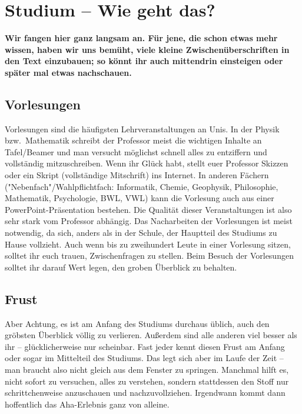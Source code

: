 \section{Studium -- Wie geht das?}
\begin{multicols}{2}
\fibelspacingsubsubsection[subsection]

\textbf{Wir fangen hier ganz langsam an.
Für jene, die schon etwas mehr wissen, haben wir uns bemüht, viele kleine Zwischenüberschriften in den Text einzubauen; so könnt ihr auch mittendrin einsteigen oder später mal etwas nachschauen.}

\subsection{Vorlesungen}
Vorlesungen sind die häufigsten Lehrveranstaltungen an Unis.
In der Physik bzw.\ Mathematik schreibt der Professor meist die wichtigen Inhalte an Tafel/Beamer und man versucht möglichst schnell alles zu entziffern und vollständig mitzuschreiben.
Wenn ihr Glück habt, stellt euer Professor Skizzen oder ein Skript (vollständige Mitschrift) ins Internet.
In anderen Fächern ("Nebenfach"/Wahlpflichtfach: Informatik, Chemie, Geophysik, Philosophie, Mathematik, Psychologie, BWL, VWL) kann die Vorlesung auch aus einer PowerPoint-Präsentation bestehen.
Die Qualität dieser Veranstaltungen ist also sehr stark vom Professor abhängig.
Das Nacharbeiten der Vorlesungen ist meist notwendig, da sich, anders als in der Schule, der Hauptteil des Studiums zu Hause vollzieht.
Auch wenn bis zu zweihundert Leute in einer Vorlesung sitzen, solltet ihr euch trauen, Zwischenfragen zu stellen.
Beim Besuch der Vorlesungen solltet ihr darauf Wert legen, den groben Überblick zu behalten.

\subsection{Frust}
Aber Achtung, es ist am Anfang des Studiums durchaus üblich, auch den gröbsten Überblick völlig zu verlieren.
Außerdem sind alle anderen viel besser als ihr -- glücklicherweise nur scheinbar.
Fast jeder kennt diesen Frust am Anfang oder sogar im Mittelteil des Studiums.
Das legt sich aber im Laufe der Zeit -- man braucht also nicht gleich aus dem Fenster zu springen.
Manchmal hilft es, nicht sofort zu versuchen, alles zu verstehen, sondern stattdessen den Stoff nur schrittchenweise anzuschauen und nachzuvollziehen.
Irgendwann kommt dann hoffentlich das Aha-Erlebnis ganz von alleine.


\end{multicols}
